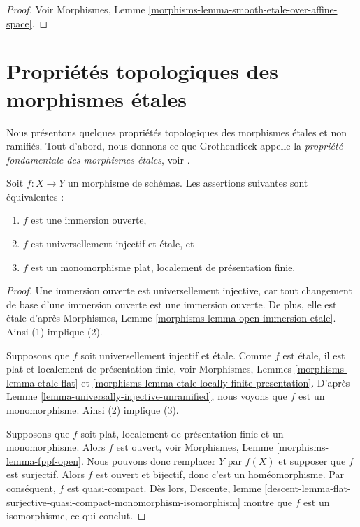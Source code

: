 \begin{proof}
Voir
Morphismes, Lemme \ref{morphisms-lemma-smooth-etale-over-affine-space}.
\end{proof}




\section{Propriétés topologiques des morphismes \'etales}
\label{section-topological-etale}

\noindent
Nous présentons quelques propriétés topologiques des morphismes \'etales et
non ramifiés. Tout d'abord, nous donnons ce que Grothendieck
appelle la {\it propriété fondamentale des morphismes \'etales}, voir
\cite[Expos\'e I.5]{SGA1}.

\begin{theorem}
\label{theorem-etale-radicial-open}
Soit $f : X \to Y$ un morphisme de schémas.
Les assertions suivantes sont équivalentes :
\begin{enumerate}
\item $f$ est une immersion ouverte,
\item $f$ est universellement injectif et \'etale, et
\item $f$ est un monomorphisme plat, localement de présentation finie.
\end{enumerate}
\end{theorem}

\begin{proof}
Une immersion ouverte est universellement injective,
car tout changement de base d'une immersion ouverte
est une immersion ouverte. De plus, elle est \'etale d'après
Morphismes, Lemme \ref{morphisms-lemma-open-immersion-etale}.
Ainsi (1) implique (2).

\medskip\noindent
Supposons que $f$ soit universellement injectif et \'etale.
Comme $f$ est \'etale, il est plat et localement de présentation finie, voir
Morphismes, Lemmes \ref{morphisms-lemma-etale-flat} et
\ref{morphisms-lemma-etale-locally-finite-presentation}.
D'après
Lemme \ref{lemma-universally-injective-unramified},
nous voyons que $f$ est un monomorphisme. Ainsi (2) implique (3).

\medskip\noindent
Supposons que $f$ soit plat, localement de présentation finie et un monomorphisme.
Alors $f$ est ouvert, voir
Morphismes, Lemme \ref{morphisms-lemma-fppf-open}.
Nous pouvons donc remplacer $Y$ par $f(X)$ et supposer que $f$ est
surjectif. Alors $f$ est ouvert et bijectif, donc c'est un homéomorphisme.
Par conséquent, $f$ est quasi-compact. Dès lors,
Descente, lemme
\ref{descent-lemma-flat-surjective-quasi-compact-monomorphism-isomorphism}
montre que $f$ est un isomorphisme, ce qui conclut.
\end{proof}

